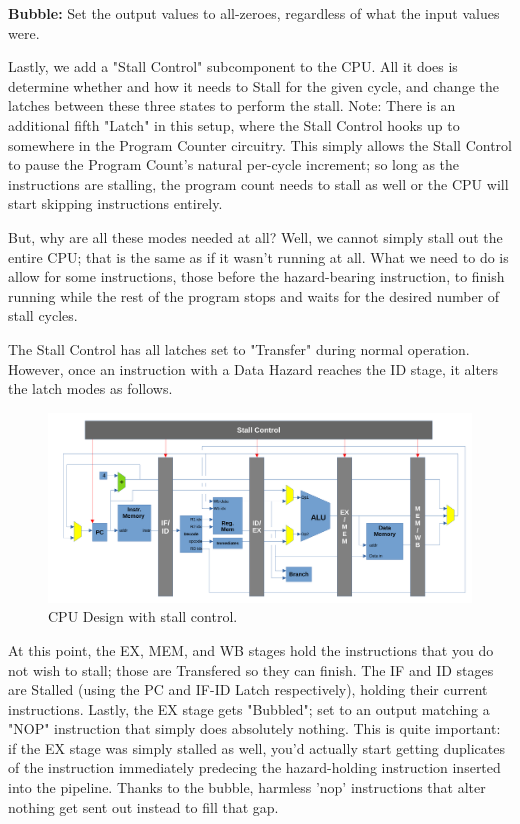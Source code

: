 \documentclass[12pt,twoside]{reedthesis}
\begin{document}
\qquad \textbf{Bubble:} Set the output values to all-zeroes, regardless of what the input values were.

Lastly, we add a "Stall Control" subcomponent to the CPU. All it does is determine whether and how it needs to Stall for the given cycle, and  change the latches between these three states to perform the stall. Note: There is an additional fifth "Latch" in this setup, where the Stall Control hooks up to somewhere in the Program Counter circuitry. This simply allows the Stall Control to pause the Program Count's natural per-cycle increment; so long as the instructions are stalling, the program count needs to stall as well or the CPU will start skipping instructions entirely.

But, why are all these modes needed at all? Well, we cannot simply stall out the entire CPU; that is the same as if it wasn't running at all. What we need to do is allow for some instructions, those before the hazard-bearing instruction, to finish running while the rest of the program stops and waits for the desired number of stall cycles.

The Stall Control has all latches set to "Transfer" during normal operation. However, once an instruction with a Data Hazard reaches the ID stage, it alters the latch modes as follows.

\begin{figure}[h!]

	\centering
	\includegraphics[scale=0.36]{cpu_stallctl}
	\caption{CPU Design with stall control.}
	\label{stall-ctl}
\end{figure}

At this point, the EX, MEM, and WB stages hold the instructions that you do not wish to stall; those are Transfered so they can finish. The IF and ID stages are Stalled (using the PC and IF-ID Latch respectively), holding their current instructions. Lastly, the EX stage gets "Bubbled"; set to an output matching a "NOP" instruction that simply does absolutely nothing. This is quite important: if the EX stage was simply stalled as well, you'd actually start getting duplicates of the instruction immediately predecing the hazard-holding instruction inserted into the pipeline. Thanks to the bubble, harmless 'nop' instructions that alter nothing get sent out instead to fill that gap.
\end{document}
